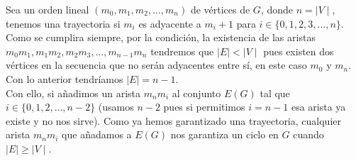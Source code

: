 \documentclass[12pt]{article}
\begin{document}
Sea un orden lineal $(m_0, m_1, m_2, \dots , m_n)$ de vértices de $G$, donde $n = \mid V \mid$, tenemos una trayectoria si $m_i$ es adyacente a $m_i+1$
para $i \in \{0, 1, 2, 3, \dots, n\}$.\\

Como se cumplira siempre, por la condición, la existencia de las aristas $m_0 m_1, m_1 m_2, m_2 m_3, \dots , m_{n-1} m_n$ tendremos que 
$\mid E \mid < \mid V \mid$ pues existen dos vértices en la secuencia que no serán adyacentes entre sí, en este caso $m_0$ y $m_n$. Con lo anterior 
tendríamos $\mid E \mid = n - 1$.\\

Con ello, si añadimos un arista $m_n m_i$ al conjunto $E(G)$ tal que $i \in \{0, 1, 2, \dots, n-2\}$ (usamos $n-2$ pues si permitimos $i = n-1$ esa arista ya existe y no nos sirve).
Como ya hemos garantizado una trayectoria, cualquier arista $m_n m_i$ que añadamos a $E(G)$ nos garantiza un ciclo en $G$ cuando $\mid E \mid \geq \mid V \mid$.
\end{document}
